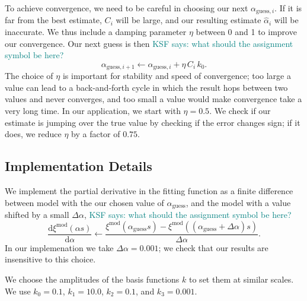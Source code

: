 \documentclass[modern]{aastex62}
\newcommand{\dd}{\mathrm{d}}
\newcommand{\KSF}[1]{\textcolor{teal}{KSF says: #1}}
\begin{document}
To achieve convergence, we need to be careful in choosing our next $\alpha_{\mathrm{guess},i}$.
If it is far from the best estimate, $C_i$ will be large, and our resulting estimate $\hat{\alpha}_{i}$ will be inaccurate.
We thus include a damping parameter $\eta$ between 0 and 1 to improve our convergence.
Our next guess is then
\KSF{what should the assignment symbol be here?}
\begin{equation}
    \alpha_{\mathrm{guess},i+1} \leftarrow \alpha_{\mathrm{guess},i} + \eta\,C_i\,k_0.
\end{equation}
The choice of $\eta$ is important for stability and speed of convergence; too large a value can lead to a back-and-forth cycle in which the result hops between two values and never converges, and too small a value would make convergence take a very long time.
In our application, we start with $\eta=0.5$.
We check if our estimate is jumping over the true value by checking if the error changes sign; if it does, we reduce $\eta$ by a factor of $0.75$.

\subsection{Implementation Details}

We implement the partial derivative in the fitting function as a finite difference between model with the our chosen value of $\alpha_\mathrm{guess}$, and the model with a value shifted by a small $\Delta \alpha$,
\KSF{what should the assignment symbol be here?}
\begin{equation}
    \frac{\dd \xi^\mathrm{mod}(\alpha s)}{\dd \alpha} \leftarrow \frac{\xi^\mathrm{mod}(\alpha_\mathrm{guess} s) - \xi^\mathrm{mod}((\alpha_\mathrm{guess} + \Delta \alpha)s)}{\Delta \alpha}.
\end{equation}
In our implemenation we take $\Delta \alpha = 0.001$; we check that our results are insensitive to this choice.

We choose the amplitudes of the basis functions $k$ to set them at similar scales.
We use $k_0=0.1$, $k_1=10.0$, $k_2=0.1$, and $k_3=0.001$.

% 
%

\end{document}
